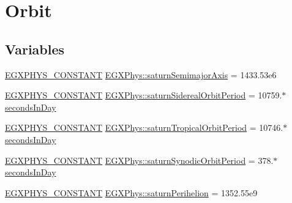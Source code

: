 \hypertarget{group___e_g_x_phys-_constants-_astrophysics-_solar_system-_saturn-_orbit}{}\section{Orbit}
\label{group___e_g_x_phys-_constants-_astrophysics-_solar_system-_saturn-_orbit}
\subsection*{Variables}
\begin{DoxyCompactItemize}
\item 
\mbox{\hyperlink{group___e_g_x_phys-_constants-_macros_ga76980d288494ce1714c9ac68a95ba702}{E\+G\+X\+P\+H\+Y\+S\+\_\+\+C\+O\+N\+S\+T\+A\+NT}} \mbox{\hyperlink{group___e_g_x_phys-_constants-_astrophysics-_solar_system-_saturn-_orbit_ga65da0ac69d15eea1dfcec3e36bebbafd}{E\+G\+X\+Phys\+::saturn\+Semimajor\+Axis}} = 1433.\+53e6
\item 
\mbox{\hyperlink{group___e_g_x_phys-_constants-_macros_ga76980d288494ce1714c9ac68a95ba702}{E\+G\+X\+P\+H\+Y\+S\+\_\+\+C\+O\+N\+S\+T\+A\+NT}} \mbox{\hyperlink{group___e_g_x_phys-_constants-_astrophysics-_solar_system-_saturn-_orbit_ga2616da281ffae469a063f75393e2ad92}{E\+G\+X\+Phys\+::saturn\+Sidereal\+Orbit\+Period}} = 10759.$\ast$\mbox{\hyperlink{namespace_e_g_x_phys_a93d2a00d75411b58cbf63ab3fd1f8bc2}{seconds\+In\+Day}}
\item 
\mbox{\hyperlink{group___e_g_x_phys-_constants-_macros_ga76980d288494ce1714c9ac68a95ba702}{E\+G\+X\+P\+H\+Y\+S\+\_\+\+C\+O\+N\+S\+T\+A\+NT}} \mbox{\hyperlink{group___e_g_x_phys-_constants-_astrophysics-_solar_system-_saturn-_orbit_ga3c3ced59bd82dd2858e7b84a4b218f54}{E\+G\+X\+Phys\+::saturn\+Tropical\+Orbit\+Period}} = 10746.$\ast$\mbox{\hyperlink{namespace_e_g_x_phys_a93d2a00d75411b58cbf63ab3fd1f8bc2}{seconds\+In\+Day}}
\item 
\mbox{\hyperlink{group___e_g_x_phys-_constants-_macros_ga76980d288494ce1714c9ac68a95ba702}{E\+G\+X\+P\+H\+Y\+S\+\_\+\+C\+O\+N\+S\+T\+A\+NT}} \mbox{\hyperlink{group___e_g_x_phys-_constants-_astrophysics-_solar_system-_saturn-_orbit_ga22ca86e26fcfc5edef67f249703c532f}{E\+G\+X\+Phys\+::saturn\+Synodic\+Orbit\+Period}} = 378.$\ast$\mbox{\hyperlink{namespace_e_g_x_phys_a93d2a00d75411b58cbf63ab3fd1f8bc2}{seconds\+In\+Day}}
\item 
\mbox{\hyperlink{group___e_g_x_phys-_constants-_macros_ga76980d288494ce1714c9ac68a95ba702}{E\+G\+X\+P\+H\+Y\+S\+\_\+\+C\+O\+N\+S\+T\+A\+NT}} \mbox{\hyperlink{group___e_g_x_phys-_constants-_astrophysics-_solar_system-_saturn-_orbit_ga885e13428fef6b0601c47e34fb60d1c3}{E\+G\+X\+Phys\+::saturn\+Perihelion}} = 1352.\+55e9

\end{DoxyCompactItemize}

